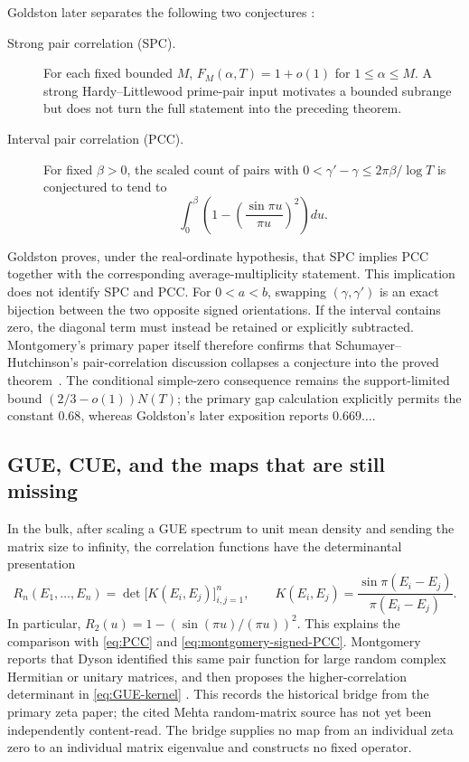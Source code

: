 Goldston later separates the following two conjectures
\cite[Sec.~6, eqs.~(6.6)--(6.9)]{goldston2004}:
\begin{description}
  \item[Strong pair correlation (SPC).]
  For each fixed bounded $M$,
  $F_M(\alpha,T)=1+o(1)$ for $1\leq\alpha\leq M$.
  A strong Hardy--Littlewood prime-pair input motivates a bounded subrange but does not turn
  the full statement into the preceding theorem.
  \item[Interval pair correlation (PCC).]
  For fixed $\beta>0$, the scaled count of pairs with
  $0<\gamma'-\gamma\leq2\pi\beta/\log T$ is conjectured to tend to
  \begin{equation}
    \int_0^\beta\left(1-\left(\frac{\sin\pi u}{\pi u}\right)^2\right)du.
    \label{eq:PCC}
  \end{equation}
\end{description}
Goldston proves, under the real-ordinate hypothesis, that SPC implies PCC together with the
corresponding average-multiplicity statement.  This implication does not identify SPC and
PCC.  For $0<a<b$, swapping $(\gamma,\gamma')$ is an exact bijection between the two
opposite signed orientations.  If the interval contains zero, the diagonal term must instead
be retained or explicitly subtracted.  Montgomery's primary paper itself therefore confirms
that Schumayer--Hutchinson's pair-correlation discussion collapses a conjecture into the
proved theorem~\cite[pair-correlation discussion]{schumayerHutchinson2011}.
The conditional simple-zero consequence remains the support-limited bound
$(2/3-o(1))N(T)$; the primary gap calculation explicitly permits the constant $0.68$,
whereas Goldston's later exposition reports $0.669\ldots$.

\subsection{GUE, CUE, and the maps that are still missing}

In the bulk, after scaling a GUE spectrum to unit mean density and sending the matrix size to
infinity, the correlation functions have the determinantal presentation
\cite[random-matrix correlation discussion]{bogomolny2007}
\begin{equation}
 R_n(E_1,\dots,E_n)=\det\bigl[K(E_i,E_j)\bigr]_{i,j=1}^n,
 \qquad
 K(E_i,E_j)=\frac{\sin\pi(E_i-E_j)}{\pi(E_i-E_j)}.
 \label{eq:GUE-kernel}
\end{equation}
In particular, $R_2(u)=1-(\sin(\pi u)/(\pi u))^2$.  This explains the comparison with
\eqref{eq:PCC} and \eqref{eq:montgomery-signed-PCC}.  Montgomery reports that Dyson
identified this same pair function for large random complex Hermitian or unitary matrices,
and then proposes the higher-correlation determinant in \eqref{eq:GUE-kernel}
\cite[pp.~184--185, eqs.~(15)--(17)]{montgomery1973}.  This records
the historical bridge from the primary zeta paper; the cited Mehta random-matrix source has
not yet been independently content-read.  The bridge supplies no map from an individual
zeta zero to an individual matrix eigenvalue and constructs no fixed operator.

